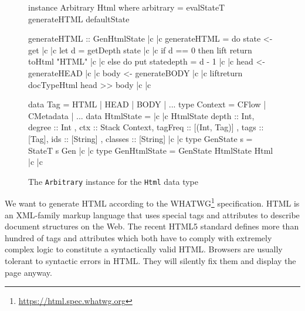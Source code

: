 \documentclass[sigconf,review, anonymous]{acmart}
\begin{document}
\begin{figure}[t]
  \begin{haskell}
instance Arbitrary Html where
  arbitrary = evalStateT generateHTML defaultState

generateHTML :: GenHtmlState |c \label{ref.generateHTML.begin} |c
generateHTML = do
  state <- get |c \label{ref.generateHTML.getState} |c   
  let d = getDepth state |c \label{ref.generateHTML.getDepth} |c
  if d == 0
  then lift \dollar return \dollar toHtml "HTML" |c \label{ref.generateHTML.returnString} |c
  else do put state{depth = d - 1} |c \label{ref.generateHTML.updateState} |c
           head <- generateHEAD |c \label{ref.generateHTML.newHead} |c
           body <- generateBODY |c \label{ref.generateHTML.newBody} |c
           lift\dollar return \dollar docTypeHtml \dollar head >> body |c \label{ref.generateHTML.end} |c

data Tag = HTML | HEAD | BODY | ...
type Context = CFlow | CMetadata | ...
data HtmlState = |c \label{ref.HtmlState.begin} |c
  HtmlState { depth    :: Int,           degree  :: Int    
             , ctx     :: Stack Context, tagFreq :: [(Int, Tag)] 
             , tags    :: [Tag],         ids     :: [String]
             , classes :: [String] } |c \label{ref.HtmlState.end} |c
type GenState s = StateT s Gen |c \label{ref.GenState} |c
type GenHtmlState = GenState HtmlState Html |c \label{ref.GenHtmlState} |c
  \end{haskell}
  \caption{The \texttt{Arbitrary} instance for the \texttt{Html} data type}
  \label{fig.html.arb.def}
\end{figure}

We want to generate HTML according to the WHATWG\footnote{\url{https://html.spec.whatwg.org}} specification. HTML is an XML-family markup language that uses special tags and attributes to describe document structures on the Web. The recent HTML5 standard defines more than hundred of tags and attributes which both have to comply with extremely complex logic to constitute a syntactically valid HTML. Browsers are usually tolerant to syntactic errors in HTML. They will silently fix them and display the page anyway.
\end{document}
